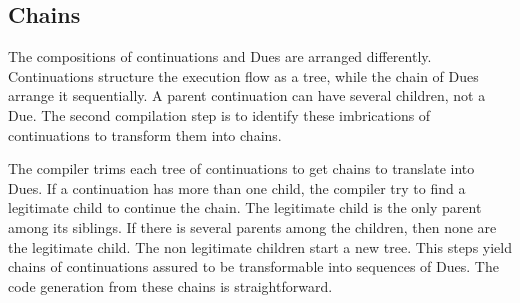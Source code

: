 \subsection{Chains}

The compositions of continuations and Dues are arranged differently.
Continuations structure the execution flow as a tree, while the chain of Dues arrange it sequentially.
A parent continuation can have several children, not a Due.
The second compilation step is to identify these imbrications of continuations to transform them into chains.

The compiler trims each tree of continuations to get chains to translate into Dues.
If a continuation has more than one child, the compiler try to find a legitimate child to continue the chain.
The legitimate child is the only parent among its siblings.
If there is several parents among the children, then none are the legitimate child.
The non legitimate children start a new tree.
This steps yield chains of continuations assured to be transformable into sequences of Dues.
The code generation from these chains is straightforward.







